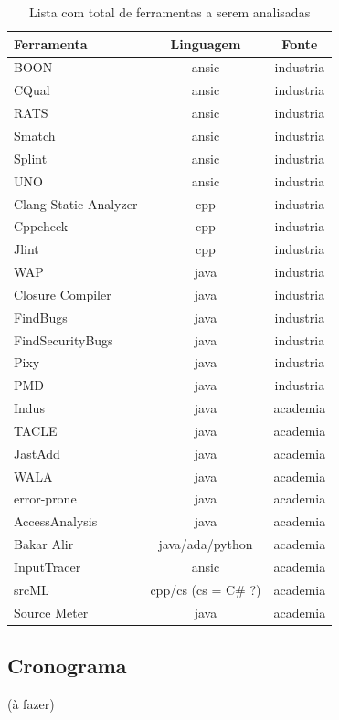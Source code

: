 \documentclass[12pt]{article}
\begin{document}
\begin{table}
\caption{Lista com total de ferramentas a serem analisadas}
\centering
\begin{tabular}{| l | c | c |}
\hline
Ferramenta & Linguagem & Fonte \\
\hline
BOON                  & ansic                & industria \\
CQual                 & ansic                & industria \\
RATS                  & ansic                & industria \\
Smatch                & ansic                & industria \\
Splint                & ansic                & industria \\
UNO                   & ansic                & industria \\
Clang Static Analyzer & cpp                  & industria \\
Cppcheck              & cpp                  & industria \\
Jlint                 & cpp                  & industria \\
WAP                   & java                 & industria \\
Closure Compiler      & java                 & industria \\
FindBugs              & java                 & industria \\
FindSecurityBugs      & java                 & industria \\
Pixy                  & java                 & industria \\
PMD                   & java                 & industria \\
Indus                 & java                 & academia  \\
TACLE                 & java                 & academia  \\
JastAdd               & java                 & academia  \\
WALA                  & java                 & academia  \\
error-prone           & java                 & academia  \\
AccessAnalysis        & java                 & academia  \\
Bakar Alir            & java/ada/python      & academia  \\
InputTracer           & ansic                & academia  \\
srcML                 & cpp/cs (cs = C\# ?)   & academia  \\
Source Meter          & java                 & academia  \\
\hline
\end{tabular}
\label{total-de-ferramentas}
\end{table}

\subsection{Cronograma}

(à fazer)


\end{document}
